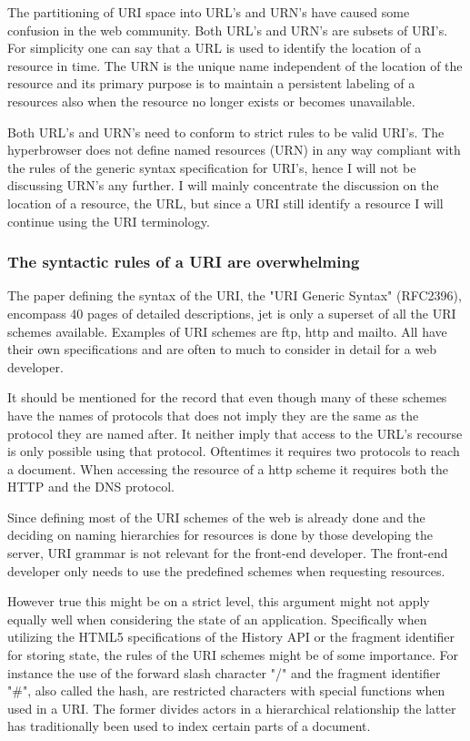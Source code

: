 \documentclass[english]{ifimaster}
\begin{document}
The partitioning of URI space into URL's and URN's have caused some confusion in the web community\parencite{w3c_URI}. Both URL's and URN's are subsets of URI's. For simplicity one can say that a URL is used to identify the location of a resource in time. The URN is the unique name independent of the location of the resource and its primary purpose is to maintain a persistent labeling of a resources also when the resource no longer exists or becomes unavailable. 

Both URL's and URN's need to conform to strict rules to be valid URI's. The hyperbrowser does not define named resources (URN) in any way compliant with the rules of the generic syntax specification for URI's, hence I will not be discussing URN's any further. I will mainly concentrate the discussion on the location of a resource, the URL, but since a URI still identify a resource I will continue using the URI terminology. 

\subsubsection{The syntactic rules of a URI are overwhelming}
The paper defining the syntax of the URI, the "URI Generic Syntax" (RFC2396), encompass 40 pages of detailed descriptions, jet is only a superset of all the URI schemes available. Examples of URI schemes are ftp, http and mailto. All have their own specifications and are often to much to consider in detail for a web developer. 

It should be mentioned for the record that even though many of these schemes have the names of protocols that does not imply they are the same as the protocol they are named after. It neither imply that access to the URL's recourse is only possible using that protocol. Oftentimes it requires two protocols to reach a document. When accessing the resource of a http scheme it requires both the HTTP and the DNS protocol\parencite{rfc_URI}.

Since defining most of the URI schemes of the web is already done and the deciding on naming hierarchies for resources is done by those developing the server, URI grammar is not relevant for the front-end developer. The front-end developer only needs to use the predefined schemes when requesting resources. 

However true this might be on a strict level, this argument might not apply equally well when considering the state of an application. Specifically when utilizing the HTML5 specifications of the History API or the fragment identifier for storing state, the rules of the URI schemes might be of some importance. For instance the use of the forward slash character "/" and the fragment identifier "\#", also called the hash, are restricted characters with special functions when used in a URI. The former divides actors in a hierarchical relationship the latter has traditionally been used to index certain parts of a document. 
\end{document}
